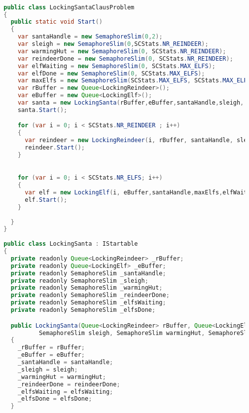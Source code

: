 \begin{lstlisting}[label=lst:impl_santa_lock,
  caption={Lock based Santa Clause Implementation},
  language=Java,  
  showspaces=false,
  showtabs=false,
  breaklines=true,
  showstringspaces=false,
  breakatwhitespace=true,
  commentstyle=\color{greencomments},
  keywordstyle=\color{bluekeywords},
  stringstyle=\color{redstrings},
  escapechar=~,
  morekeywords={atomic, retry, orelse, var, get, set, ref, out, readonly, virtual, override}]  % Start your code-block

  public class LockingSantaClausProblem
  {
    public static void Start()
    {
      var santaHandle = new SemaphoreSlim(0,2); 
      var sleigh = new SemaphoreSlim(0,SCStats.NR_REINDEER);
      var warmingHut = new SemaphoreSlim(0, SCStats.NR_REINDEER);
      var reindeerDone = new SemaphoreSlim(0, SCStats.NR_REINDEER);
      var elfWaiting = new SemaphoreSlim(0, SCStats.MAX_ELFS);
      var elfDone = new SemaphoreSlim(0, SCStats.MAX_ELFS);
      var maxElfs = new SemaphoreSlim(SCStats.MAX_ELFS, SCStats.MAX_ELFS);
      var rBuffer = new Queue<LockingReindeer>();
      var eBuffer = new Queue<LockingElf>();
      var santa = new LockingSanta(rBuffer,eBuffer,santaHandle,sleigh, warmingHut,reindeerDone,elfWaiting, elfDone);
      santa.Start();

      for (var i = 0; i < SCStats.NR_REINDEER ; i++)
      {
        var reindeer = new LockingReindeer(i, rBuffer, santaHandle, sleigh, warmingHut, reindeerDone);
        reindeer.Start();
      }

            
      for (var i = 0; i < SCStats.NR_ELFS; i++)
      {
        var elf = new LockingElf(i, eBuffer,santaHandle,maxElfs,elfWaiting,elfDone);
        elf.Start();
      }
            
    }
  }
  
  public class LockingSanta : IStartable
  {
    private readonly Queue<LockingReindeer> _rBuffer;
    private readonly Queue<LockingElf> _eBuffer;
    private readonly SemaphoreSlim _santaHandle;
    private readonly SemaphoreSlim _sleigh;
    private readonly SemaphoreSlim _warmingHut;
    private readonly SemaphoreSlim _reindeerDone;
    private readonly SemaphoreSlim _elfsWaiting;
    private readonly SemaphoreSlim _elfsDone;

    public LockingSanta(Queue<LockingReindeer> rBuffer, Queue<LockingElf> eBuffer, SemaphoreSlim santaHandle,
            SemaphoreSlim sleigh, SemaphoreSlim warmingHut, SemaphoreSlim reindeerDone, SemaphoreSlim elfsWaiting, SemaphoreSlim elfsDone)
    {
      _rBuffer = rBuffer;
      _eBuffer = eBuffer;
      _santaHandle = santaHandle;
      _sleigh = sleigh;
      _warmingHut = warmingHut;
      _reindeerDone = reindeerDone;
      _elfsWaiting = elfsWaiting;
      _elfsDone = elfsDone;
    }


\end{lstlisting}
